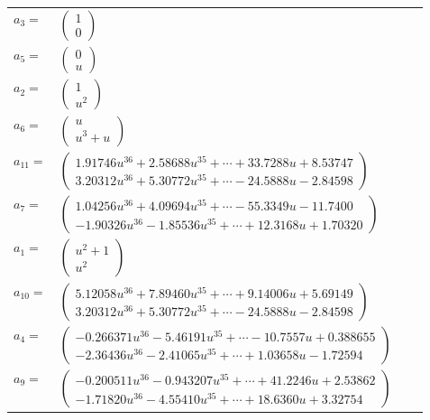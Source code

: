 \documentclass[1p]{elsarticle_modified}
\theoremstyle{definition}
\begin{document}
\begin{tabular}{m{7pt} m{180pt} m{7pt} m{180pt} }
\flushright $a_{3}=$&$\begin{pmatrix}1\\0\end{pmatrix}$ \\
\flushright $a_{5}=$&$\begin{pmatrix}0\\u\end{pmatrix}$ \\
\flushright $a_{2}=$&$\begin{pmatrix}1\\u^2\end{pmatrix}$ \\
\flushright $a_{6}=$&$\begin{pmatrix}u\\u^3+u\end{pmatrix}$ \\
\flushright $a_{11}=$&$\begin{pmatrix}1.91746 u^{36}+2.58688 u^{35}+\cdots+33.7288 u+8.53747\\3.20312 u^{36}+5.30772 u^{35}+\cdots-24.5888 u-2.84598\end{pmatrix}$ \\
\flushright $a_{7}=$&$\begin{pmatrix}1.04256 u^{36}+4.09694 u^{35}+\cdots-55.3349 u-11.7400\\-1.90326 u^{36}-1.85536 u^{35}+\cdots+12.3168 u+1.70320\end{pmatrix}$ \\
\flushright $a_{1}=$&$\begin{pmatrix}u^2+1\\u^2\end{pmatrix}$ \\
\flushright $a_{10}=$&$\begin{pmatrix}5.12058 u^{36}+7.89460 u^{35}+\cdots+9.14006 u+5.69149\\3.20312 u^{36}+5.30772 u^{35}+\cdots-24.5888 u-2.84598\end{pmatrix}$ \\
\flushright $a_{4}=$&$\begin{pmatrix}-0.266371 u^{36}-5.46191 u^{35}+\cdots-10.7557 u+0.388655\\-2.36436 u^{36}-2.41065 u^{35}+\cdots+1.03658 u-1.72594\end{pmatrix}$ \\
\flushright $a_{9}=$&$\begin{pmatrix}-0.200511 u^{36}-0.943207 u^{35}+\cdots+41.2246 u+2.53862\\-1.71820 u^{36}-4.55410 u^{35}+\cdots+18.6360 u+3.32754\end{pmatrix}$ \\

\end{tabular}
\end{document}
